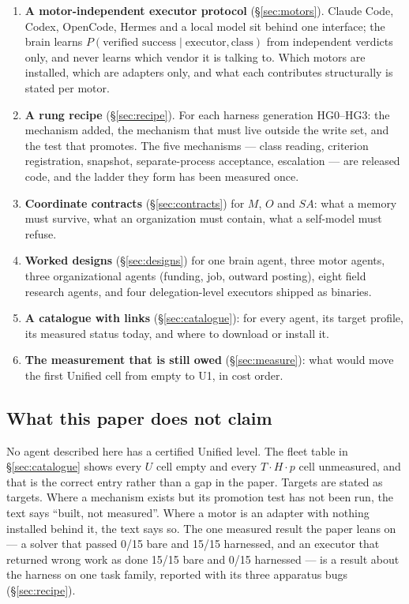 \documentclass[11pt]{article}
\theoremstyle{definition}
\begin{document}
\begin{enumerate}[leftmargin=*]
\item \textbf{A motor-independent executor protocol} (\S\ref{sec:motors}). Claude Code, Codex, OpenCode, Hermes and a local model sit behind one interface; the brain learns $P(\text{verified success} \mid \text{executor}, \text{class})$ from independent verdicts only, and never learns which vendor it is talking to. Which motors are installed, which are adapters only, and what each contributes structurally is stated per motor.
\item \textbf{A rung recipe} (\S\ref{sec:recipe}). For each harness generation HG0--HG3: the mechanism added, the mechanism that must live outside the write set, and the test that promotes. The five mechanisms --- class reading, criterion registration, snapshot, separate-process acceptance, escalation --- are released code, and the ladder they form has been measured once.
\item \textbf{Coordinate contracts} (\S\ref{sec:contracts}) for $M$, $O$ and $SA$: what a memory must survive, what an organization must contain, what a self-model must refuse.
\item \textbf{Worked designs} (\S\ref{sec:designs}) for one brain agent, three motor agents, three organizational agents (funding, job, outward posting), eight field research agents, and four delegation-level executors shipped as binaries.
\item \textbf{A catalogue with links} (\S\ref{sec:catalogue}): for every agent, its target profile, its measured status today, and where to download or install it.
\item \textbf{The measurement that is still owed} (\S\ref{sec:measure}): what would move the first Unified cell from empty to U1, in cost order.
\end{enumerate}

\subsection{What this paper does not claim}

No agent described here has a certified Unified level. The fleet table in \S\ref{sec:catalogue} shows every $U$ cell empty and every $T{\cdot}H{\cdot}p$ cell unmeasured, and that is the correct entry rather than a gap in the paper. Targets are stated as targets. Where a mechanism exists but its promotion test has not been run, the text says ``built, not measured''. Where a motor is an adapter with nothing installed behind it, the text says so. The one measured result the paper leans on --- a solver that passed 0/15 bare and 15/15 harnessed, and an executor that returned wrong work as done 15/15 bare and 0/15 harnessed --- is a result about the harness on one task family, reported with its three apparatus bugs (\S\ref{sec:recipe}).
\end{document}
